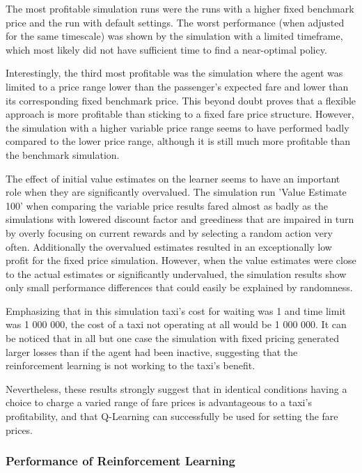 The most profitable simulation runs were the runs with a higher fixed benchmark
price and the run with default settings. The worst performance (when adjusted
for the same timescale) was shown by the simulation with a limited timeframe,
which most likely did not have sufficient time to find a near-optimal policy.

Interestingly, the third most profitable was the simulation where the agent was
limited to a price range lower than the passenger's expected fare and lower
than its corresponding fixed benchmark price. This beyond doubt proves that a
flexible approach is more profitable than sticking to a fixed fare price
structure. However, the simulation with a higher variable price range seems to
have performed badly compared to the lower price range, although it is still
much more profitable than the benchmark simulation.

The effect of initial value estimates on the learner seems to have an important
role when they are significantly overvalued. The simulation run 'Value Estimate
100' when comparing the variable price results fared almost as badly as the
simulations with lowered discount factor and greediness that are impaired in
turn by overly focusing on current rewards and by selecting a random action
very often. Additionally the overvalued estimates resulted in an exceptionally
low profit for the fixed price simulation. However, when the value estimates
were close to the actual estimates or significantly undervalued, the simulation
results show only small performance differences that could easily be explained
by randomness.

Emphasizing that in this simulation taxi's cost for waiting was 1 and time
limit was 1 000 000, the cost of a taxi not operating at all would be 1 000
000. It can be noticed that in all but one case the simulation with fixed
pricing generated larger losses than if the agent had been inactive, suggesting
that the reinforcement learning is not working to the taxi's benefit.

Nevertheless, these results strongly suggest that in identical conditions
having a choice to charge a varied range of fare prices is advantageous to a
taxi's profitability, and that Q-Learning can successfully be used for setting
the fare prices.


\subsubsection{Performance of Reinforcement Learning}
\label{sec:results:ai}

